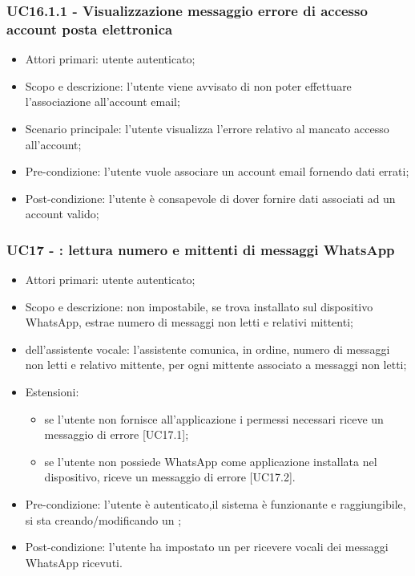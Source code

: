 \subsubsection{UC16.1.1 - Visualizzazione messaggio errore di accesso account posta elettronica}
\begin{itemize}
	\item  Attori primari: utente autenticato;
	\item  Scopo e descrizione: l'utente viene avvisato di non poter effettuare l'associazione all'account email;
	\item  Scenario principale: l'utente visualizza l'errore relativo al mancato accesso all'account;
	\item  Pre-condizione: l'utente vuole associare un account email fornendo dati errati;
	\item  Post-condizione: l'utente è consapevole di dover fornire dati associati ad un account valido;
\end{itemize}
\subsubsection{UC17 - : lettura numero e mittenti di messaggi WhatsApp}
\begin{itemize}
	\item  Attori primari: utente autenticato;
	\item  Scopo e descrizione:  non impostabile, se trova installato sul dispositivo WhatsApp, estrae numero di messaggi non letti e relativi mittenti;
	\item  {} dell'assistente vocale: l'assistente comunica, in ordine, numero di messaggi non letti e relativo mittente, per ogni mittente associato a messaggi non letti;
	\item  Estensioni:
		   \begin{itemize}
				\item se l'utente non fornisce all'applicazione i permessi necessari riceve un messaggio di errore [UC17.1];
				\item se l'utente non possiede WhatsApp come applicazione installata nel dispositivo, riceve un messaggio di errore [UC17.2].
		   \end{itemize}
	\item  Pre-condizione: l'utente è autenticato,il sistema è funzionante e raggiungibile, si sta creando/modificando un ;
	\item  Post-condizione: l'utente ha impostato un  per ricevere  vocali dei messaggi WhatsApp ricevuti.
\end{itemize}
